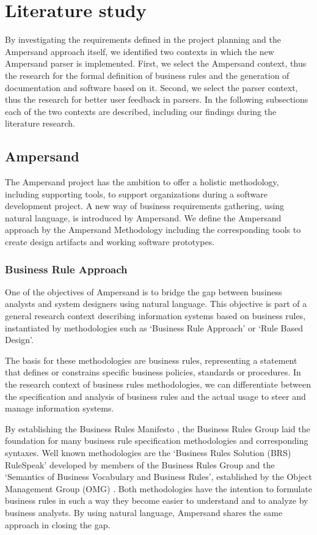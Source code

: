 
\section{Literature study}
\label{sec:literature-study}
By investigating the requirements defined in the project planning  and the Ampersand approach itself, we identified two contexts in which the new Ampersand parser is implemented.
First, we select the Ampersand context, thus the research for the formal definition of business rules and the generation of documentation and software based  on it.
Second, we select the parser context, thus the research for better user feedback in parsers.
In the following subsections each of the two contexts are described, including our findings during the literature research.

\subsection{Ampersand}
The Ampersand project has the ambition to offer a holistic methodology, including supporting tools, to support organizations during a software development project.
A new way of business requirements gathering, using natural language, is introduced by Ampersand.
We define the Ampersand approach by the Ampersand Methodology including the corresponding tools to create design artifacts and working software prototypes.

\subsubsection{Business Rule Approach}
One of  the objectives of Ampersand is to bridge the gap between business analysts and system designers using natural language.
This objective is part of a general research context describing information systems based on business rules, instantiated by methodologies such as `Business Rule Approach' or `Rule Based Design'.

The basis for these methodologies are business rules, representing a statement that defines or constrains specific business policies, standards or procedures.
In the research context of business rules methodologies, we can differentiate between the specification and analysis of business rules and the actual usage to steer and manage information systems.

%
%
By establishing the Business Rules Manifesto , the Business Rules Group laid the foundation for many business rule specification methodologies and corresponding syntaxes.
Well known methodologies are the `Business Rules Solution (BRS) RuleSpeak' developed by members of the Business Rules Group  and the `Semantics of Business Vocabulary and Business Rules', established by the Object Management Group (OMG) .
Both methodologies have the intention to formulate business rules in such a way they become easier to understand and to analyze by business analysts.
By using natural language, Ampersand shares the same approach in closing the gap.

